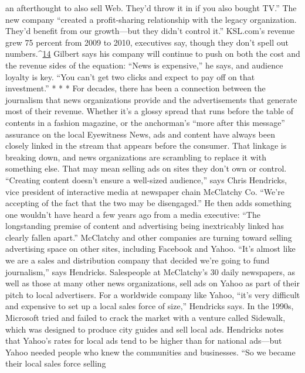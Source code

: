 an afterthought to also sell Web. They’d throw it in if you also bought TV.'' The
new company ``created a profit-sharing relationship with the legacy organization.
They’d benefit from our growth—but they didn’t control it.''
KSL.com’s revenue grew 75 percent from 2009 to 2010, executives say, though
they don’t spell out numbers.^{\href{#endnotes-ch8}{14}} Gilbert says his company will continue to push
on both the cost and the revenue sides of the equation: ``News is expensive,'' he
says, and audience loyalty is key. ``You can’t get two clicks and expect to pay off
on that investment.''
* * *
For decades, there has been a connection between the journalism that news
organizations provide and the advertisements that generate most of their revenue.
Whether it’s a glossy spread that runs before the table of contents in a fashion
magazine, or the anchorman’s ``more after this message'' assurance on the local
Eyewitness News, ads and content have always been closely linked in the stream
that appears before the consumer.
That linkage is breaking down, and news organizations are scrambling to replace
it with something else. That may mean selling ads on sites they don’t own
or control. ``Creating content doesn’t ensure a well-sized audience,'' says Chris
Hendricks, vice president of interactive media at newspaper chain McClatchy
Co. ``We’re accepting of the fact that the two may be disengaged.'' He then adds
something one wouldn’t have heard a few years ago from a media executive:
``The longstanding premise of content and advertising being inextricably linked
has clearly fallen apart.''
McClatchy and other companies are turning toward selling advertising space on
other sites, including Facebook and Yahoo. ``It’s almost like we are a sales and distribution
company that decided we’re going to fund journalism,'' says Hendricks.
Salespeople at McClatchy’s 30 daily newspapers, as well as those at many other
news organizations, sell ads on Yahoo as part of their pitch to local advertisers.
For a worldwide company like Yahoo, ``it’s very difficult and expensive to set
up a local sales force of size,'' Hendricks says. In the 1990s, Microsoft tried and
failed to crack the market with a venture called Sidewalk, which was designed
to produce city guides and sell local ads. Hendricks notes that Yahoo’s rates for
local ads tend to be higher than for national ads—but Yahoo needed people who
knew the communities and businesses. ``So we became their local sales force selling
